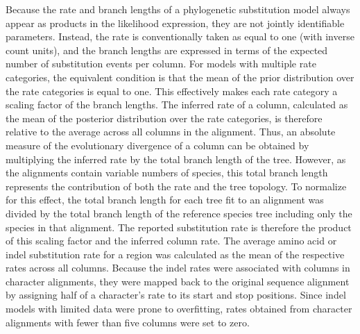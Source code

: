 Because the rate and branch lengths of a phylogenetic substitution model always appear as products in the likelihood expression, they are not jointly identifiable parameters. Instead, the rate is conventionally taken as equal to one (with inverse count units), and the branch lengths are expressed in terms of the expected number of substitution events per column. For models with multiple rate categories, the equivalent condition is that the mean of the prior distribution over the rate categories is equal to one. This effectively makes each rate category a scaling factor of the branch lengths. The inferred rate of a column, calculated as the mean of the posterior distribution over the rate categories, is therefore relative to the average across all columns in the alignment. Thus, an absolute measure of the evolutionary divergence of a column can be obtained by multiplying the inferred rate by the total branch length of the tree. However, as the alignments contain variable numbers of species, this total branch length represents the contribution of both the rate and the tree topology. To normalize for this effect, the total branch length for each tree fit to an alignment was divided by the total branch length of the reference species tree including only the species in that alignment. The reported substitution rate is therefore the product of this scaling factor and the inferred column rate. The average amino acid or indel substitution rate for a region was calculated as the mean of the respective rates across all columns. Because the indel rates were associated with columns in character alignments, they were mapped back to the original sequence alignment by assigning half of a character's rate to its start and stop positions. Since indel models with limited data were prone to overfitting, rates obtained from character alignments with fewer than five columns were set to zero.

